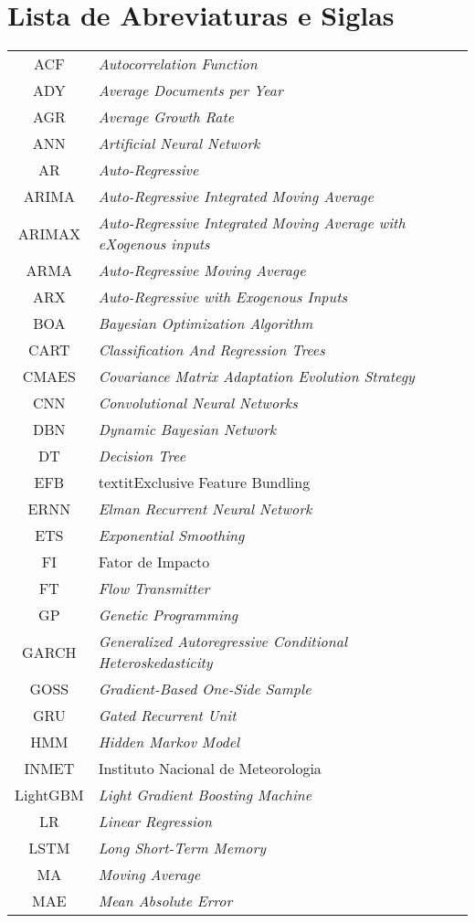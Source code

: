 \newpage
{}
\section*{Lista de Abreviaturas e Siglas}



\begin{tabular}{cp{}}
	ACF & \textit{Autocorrelation Function}\\
	ADY & \textit{Average Documents per Year}\\
	AGR & \textit{Average Growth Rate} \\
	ANN & \textit{Artificial Neural Network} \\
	AR & \textit{Auto-Regressive}\\
	ARIMA & \textit{Auto-Regressive Integrated Moving Average} \\
	ARIMAX & \textit{Auto-Regressive Integrated Moving Average with eXogenous inputs}\\
	ARMA & \textit{Auto-Regressive Moving Average} \\
	ARX & \textit{Auto-Regressive with Exogenous Inputs}\\
	BOA & \textit{Bayesian Optimization Algorithm}\\
	CART & \textit{Classification And Regression Trees} \\
	CMAES & \textit{Covariance Matrix Adaptation Evolution Strategy}\\
	CNN & \textit{Convolutional Neural Networks}\\
	DBN & \textit{Dynamic Bayesian Network} \\
	DT & \textit{Decision Tree} \\
	EFB & textit{Exclusive Feature Bundling}\\
	ERNN & \textit{Elman Recurrent Neural Network} \\
	ETS & \textit{Exponential Smoothing} \\
	FI & Fator de Impacto \\
	FT & \textit{Flow Transmitter}\\
	GP & \textit{Genetic Programming}\\
	GARCH & \textit{Generalized Autoregressive Conditional Heteroskedasticity}\\
	GOSS & \textit{Gradient-Based One-Side Sample}\\
	GRU & \textit{Gated Recurrent Unit} \\
	HMM & \textit{Hidden Markov Model}\\
	INMET & Instituto Nacional de Meteorologia\\
	LightGBM & \textit{Light Gradient Boosting Machine} \\
	LR & \textit{Linear Regression}\\
	LSTM &\textit{Long Short-Term Memory}	\\
	MA & \textit{Moving Average}\\
	MAE & \textit{Mean Absolute Error}\\
\end{tabular}


